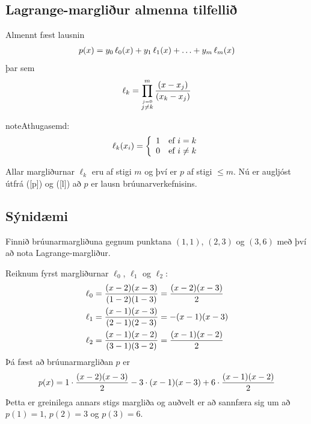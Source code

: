\documentclass[letterpaper,10pt,icelandic]{sphinxmanual}
\begin{document}
\subsection{Lagrange-margliður almenna tilfellið}
\label{kafli03:lagrange-margliur-almenna-tilfelli}
Almennt fæst lausnin
\begin{gather}
\begin{split}\label{p}
  p(x) = y_0 \, \ell_{0}(x) + y_1 \, \ell_{1}(x)
  + \ldots + y_m \, \ell_{m}(x)\end{split}\notag
\end{gather}
þar sem
\begin{gather}
\begin{split}\ell_{k} = \prod\limits_{\stackrel{j=0}{j\not=k}}^m
  \frac{(x-x_j)}{(x_k-x_j)}\end{split}\notag
\end{gather}
\begin{notice}{note}{Athugasemd:}\begin{gather}
\begin{split}\label{l}
  \ell_{k}(x_i) = \left\{ \begin{array}{cc}
      1 & \text{ef } i = k \\
      0 & \text{ef } i \not= k
  \end{array} \right.\end{split}\notag
\end{gather}\end{notice}

Allar margliðurnar \(\ell_{k}\) eru af stigi \(m\) og því er
\(p\) af stigi \(\leq m\). Nú er augljóst útfrá ({[}p{]}) og ({[}l{]})
að \(p\) er lausn brúunarverkefnisins.


\subsection{Sýnidæmi}
\label{kafli03:synidaemi}
Finnið brúunarmargliðuna gegnum punktana \((1,1)\), \((2,3)\)
og \((3,6)\) með því að nota Lagrange-margliður.

Reiknum fyrst margliðurnar \(\ell_{0}\), \(\ell_{1}\) og
\(\ell_{2}\):
\begin{gather}
\begin{split}\begin{aligned}
  \ell_{0} &= \frac{(x-2)(x-3)}{(1-2)(1-3)}
  = \frac{(x-2)(x-3)}{2} \\
  \ell_{1} &= \frac{(x-1)(x-3)}{(2-1)(2-3)}
  = -(x-1)(x-3) \\
  \ell_{2} &= \frac{(x-1)(x-2)}{(3-1)(3-2)}
  = \frac{(x-1)(x-2)}{2}\end{aligned}\end{split}\notag
\end{gather}
Þá fæst að brúunarmargliðan \(p\) er
\begin{gather}
\begin{split}p(x) = 1 \cdot \frac{(x-2)(x-3)}{2}
  - 3 \cdot (x-1)(x-3)
  + 6 \cdot \frac{(x-1)(x-2)}{2}\end{split}\notag
\end{gather}
Þetta er greinilega annars stigs margliða og auðvelt er að sannfæra sig
um að \(p(1) = 1\), \(p(2) = 3\) og \(p(3) = 6\).
\end{document}
